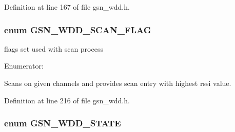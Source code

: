 Definition at line 167 of file gsn\_\-wdd.h.

\hypertarget{a00677_gaa5a68f88cc724016ff0334f21c0dd120}{
\subsubsection[{GSN\_\-WDD\_\-SCAN\_\-FLAG}]{\setlength{\rightskip}{0pt plus 5cm}enum {\bf GSN\_\-WDD\_\-SCAN\_\-FLAG}}}
\label{a00677_gaa5a68f88cc724016ff0334f21c0dd120}


flags set used with scan process 

\begin{Desc}
\item[Enumerator: ]\par
\begin{description}
\item[{\em 
\hypertarget{a00677_ggaa5a68f88cc724016ff0334f21c0dd120af8eb784f34297ba01c491b4b8e8ac4a4}{
GSN\_\-WDD\_\-SCAN\_\-FLAG\_\-HIGHEST\_\-RSSI\_\-NW\_\-FIND}
\label{a00677_ggaa5a68f88cc724016ff0334f21c0dd120af8eb784f34297ba01c491b4b8e8ac4a4}
}]Scans on given channels and provides scan entry with highest rssi value. \end{description}
\end{Desc}



Definition at line 216 of file gsn\_\-wdd.h.

\hypertarget{a00677_ga235b17af49bd1a1dc55715a7809b24ff}{
\subsubsection[{GSN\_\-WDD\_\-STATE}]{\setlength{\rightskip}{0pt plus 5cm}enum {\bf GSN\_\-WDD\_\-STATE}}}
\label{a00677_ga235b17af49bd1a1dc55715a7809b24ff}


